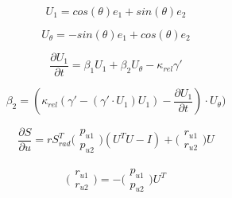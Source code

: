 \documentclass[a4paper,twoside]{article}
\begin{document}
\begin{equation}
 U_{1} = cos(\theta)e_1 + sin(\theta)e_2 
\end{equation}

\begin{equation}
U_{\theta} = -sin(\theta)e_1 + cos(\theta)e_2
\end{equation}

\begin{equation}
\frac{\partial U_1}{\partial t}  = \beta_1 U_1 + \beta_2 U_{\theta} - \kappa_{rel} \gamma'
\end{equation}

\begin{equation}
\beta_2 = (\kappa_{rel} (\gamma' - (\gamma' \cdot U_1 )U_1 ) - \frac{\partial U_1}{\partial t} ) \cdot U_{\theta})
\end{equation}

\begin{equation}
\frac{\partial S}{\partial u} = rS_{rad}^{T} \bigg( \begin{matrix} p_{u1} \\ p_{u2} \end{matrix} \bigg) (U^T U - I) + \bigg( \begin{matrix} r_{u1} \\ r_{u2} \end{matrix} \bigg) U
\end{equation}

\begin{equation}
\bigg( \begin{matrix} r_{u1} \\ r_{u2} \end{matrix} \bigg) = -\bigg(\begin{matrix} p_{u1} \\ p_{u2} \end{matrix} \bigg) U^T
\end{equation}


\vfill
\end{document}
